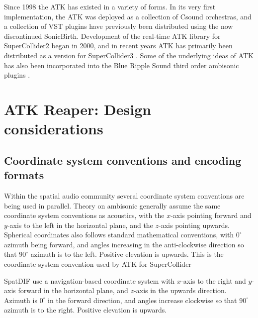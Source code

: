 \documentclass{article}
\begin{document}
Since 1998 the ATK has existed in a variety of forms.
In its very first implementation, the ATK was deployed as a collection of Csound orchestras, and a collection of VST plugins have previously been distributed using the now discontinued SonicBirth.
Development of the real-time ATK library for SuperCollider2 began in 2000, and in recent years ATK has primarily been distributed as a version for SuperCollider3 \cite{Anderson:2009introducingATK}.
Some of the underlying ideas of ATK has also been incorporated into the Blue Ripple Sound third order ambisonic plugins \cite{blueripple:2014TOA}.




\section{ATK Reaper: Design considerations}\label{sec:design}

\subsection{Coordinate system conventions and encoding formats}\label{coordinate-systems}

Within the spatial audio community several coordinate system conventions are being used in parallel.
Theory on ambisonic generally assume the same coordinate system conventions as acoustics, with the $x$-axis pointing forward and $y$-axis to the left in the horizontal plane, and the $z$-axis pointing upwards. 
Spherical coordinates also follows standard mathematical conventions, with $0^{\circ}$ azimuth being forward, and angles increasing in the anti-clockwise direction so that $90^{\circ}$ azimuth is to the left.
Positive elevation is upwards.
This is the coordinate system convention used by ATK for SuperCollider

SpatDIF use a navigation-based coordinate system with $x$-axis to the right and $y$-axis forward in the horizontal plane, and $z$-axis in the upwards direction.
Azimuth is $0^{\circ}$ in the forward direction, and angles increase clockwise so that $90^{\circ}$ azimuth is to the right.
Positive elevation is upwards.
\end{document}

